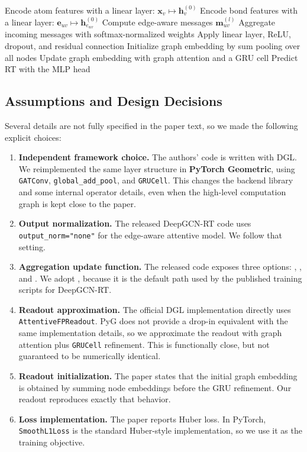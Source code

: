 \begin{algorithm}[t]
    \caption{Forward Pass of Our DeepGCN-RT Reimplementation}
    \begin{algorithmic}[1]
        \State Encode atom features with a linear layer: \(\mathbf{x}_v \mapsto \mathbf{h}^{(0)}_v\)
        \State Encode bond features with a linear layer: \(\mathbf{e}_{uv} \mapsto \mathbf{h}^{(0)}_{e_{uv}}\)
        \State Compute edge-aware messages \(\mathbf{m}^{(l)}_{uv}\)
        \State Aggregate incoming messages with softmax-normalized weights
        \State Apply linear layer, ReLU, dropout, and residual connection
        \EndFor
        \State Initialize graph embedding by sum pooling over all nodes
        \State Update graph embedding with graph attention and a GRU cell
        \EndFor
        \State Predict RT with the MLP head
    \end{algorithmic}
\end{algorithm}

\subsection{Assumptions and Design Decisions}

Several details are not fully specified in the paper text, so we made the following explicit choices:

\begin{enumerate}
    \item \textbf{Independent framework choice.} The authors' code is written with DGL. We reimplemented the same layer structure in \textbf{PyTorch Geometric}, using \texttt{GATConv}, \texttt{global\_add\_pool}, and \texttt{GRUCell}. This changes the backend library and some internal operator details, even when the high-level computation graph is kept close to the paper.
    \item \textbf{Output normalization.} The released DeepGCN-RT code uses \texttt{output\_norm="none"} for the edge-aware attentive model. We follow that setting.
    \item \textbf{Aggregation update function.} The released code exposes three options: , , and . We adopt , because it is the default path used by the published training scripts for DeepGCN-RT.
    \item \textbf{Readout approximation.} The official DGL implementation directly uses \texttt{AttentiveFPReadout}. PyG does not provide a drop-in equivalent with the same implementation details, so we approximate the readout with graph attention plus \texttt{GRUCell} refinement. This is functionally close, but not guaranteed to be numerically identical.
    \item \textbf{Readout initialization.} The paper states that the initial graph embedding is obtained by summing node embeddings before the GRU refinement. Our readout reproduces exactly that behavior.
    \item \textbf{Loss implementation.} The paper reports Huber loss. In PyTorch, \texttt{SmoothL1Loss} is the standard Huber-style implementation, so we use it as the training objective.
\end{enumerate}

